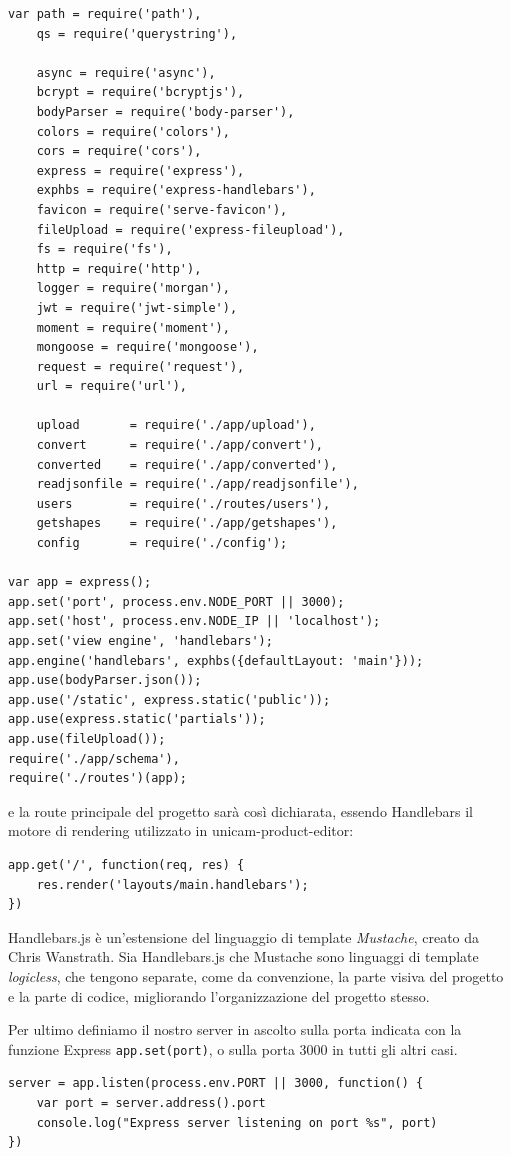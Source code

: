 \begin{lstlisting}[caption={app.js}, style=javaScriptCode]
var path = require('path'),
	qs = require('querystring'),

	async = require('async'),
	bcrypt = require('bcryptjs'),
	bodyParser = require('body-parser'),
	colors = require('colors'),
	cors = require('cors'),
	express = require('express'),
	exphbs = require('express-handlebars'),
	favicon = require('serve-favicon'),
	fileUpload = require('express-fileupload'),
	fs = require('fs'),
	http = require('http'),
	logger = require('morgan'),
	jwt = require('jwt-simple'),
	moment = require('moment'),
	mongoose = require('mongoose'),
	request = require('request'),
	url = require('url'),
	
	upload       = require('./app/upload'),
	convert      = require('./app/convert'),
	converted    = require('./app/converted'),
	readjsonfile = require('./app/readjsonfile'),
	users        = require('./routes/users'),
	getshapes    = require('./app/getshapes'),
	config       = require('./config');
	
var app = express();
app.set('port', process.env.NODE_PORT || 3000);
app.set('host', process.env.NODE_IP || 'localhost');
app.set('view engine', 'handlebars');
app.engine('handlebars', exphbs({defaultLayout: 'main'}));
app.use(bodyParser.json());
app.use('/static', express.static('public'));
app.use(express.static('partials'));
app.use(fileUpload());
require('./app/schema'),
require('./routes')(app);
\end{lstlisting}

e la route principale del progetto sarà così dichiarata, essendo Handlebars il motore di rendering utilizzato in unicam-product-editor:

\begin{lstlisting}[caption={configurazione server}, style=javaScriptCode]
app.get('/', function(req, res) {
	res.render('layouts/main.handlebars');
})
\end{lstlisting}

Handlebars.js è un'estensione del linguaggio di template \emph{Mustache}, creato da Chris Wanstrath. Sia Handlebars.js che Mustache sono linguaggi di template \emph{logicless}, che tengono separate, come da convenzione, la parte visiva del progetto e la parte di codice, migliorando l'organizzazione del progetto stesso.

Per ultimo definiamo il nostro server in ascolto sulla porta indicata con la funzione Express \texttt{app.set(port)}, o sulla porta 3000 in tutti gli altri casi.
\begin{lstlisting}[caption={configurazione server}, style=javaScriptCode]
server = app.listen(process.env.PORT || 3000, function() {
	var port = server.address().port
	console.log("Express server listening on port %s", port)
})
\end{lstlisting}

